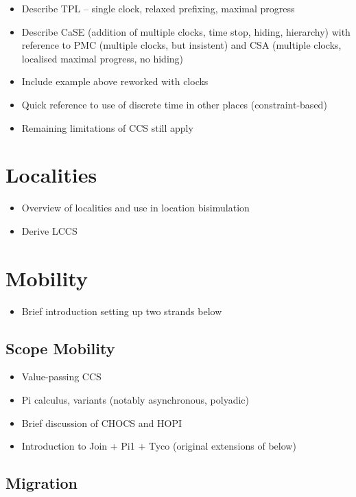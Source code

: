 \begin{itemize}
\item Describe TPL -- single clock, relaxed prefixing, maximal progress
\item Describe CaSE (addition of multiple clocks, time stop, hiding, hierarchy)
with reference to PMC (multiple clocks, but insistent) and CSA (multiple
clocks, localised maximal progress, no hiding)
\item Include example above reworked with clocks
\item Quick reference to use of discrete time in other places (constraint-based)
\item Remaining limitations of CCS still apply
\end{itemize}
\section{Localities}
\label{localities}

\begin{itemize}
\item Overview of localities and use in location bisimulation
\item Derive LCCS
\end{itemize}

\section{Mobility}
\label{mobility}

\begin{itemize}
\item Brief introduction setting up two strands below
\end{itemize}

\subsection{Scope Mobility}
\label{scopemobility}

\begin{itemize}
\item Value-passing CCS
\item Pi calculus, variants (notably asynchronous, polyadic)
\item Brief discussion of CHOCS and HOPI
\item Introduction to Join + Pi1 + Tyco (original extensions of below)
\end{itemize}

\subsection{Migration}
\label{migration}

